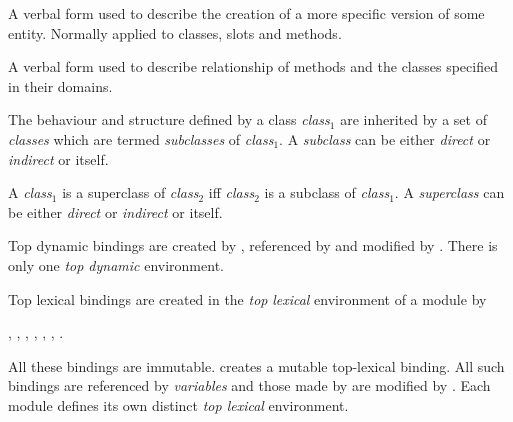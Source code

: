 \begin{optDefinition}
\begin{definitions}
     A verbal form used to
    describe the creation of a more specific version of some entity.  Normally
    applied to classes, slots and methods.

     A verbal form used
    to describe relationship of methods and the classes specified in their
    domains.

      The behaviour and structure
    defined by a class {\em class$_1$} are inherited by a set of {\em classes}
    which are termed {\em subclasses} of {\em class$_1$}.  A {\em subclass} can
    be either {\em direct} or {\em indirect} or itself.

      A {\em class$_1$} is a
    superclass of {\em class$_2$} iff {\em class$_2$} is a subclass of {\em
        class$_1$}.  A {\em superclass} can be either {\em direct} or {\em
        indirect} or itself.

     Top dynamic bindings
    are created by , referenced by 
    and modified by .  There is only one {\em top
        dynamic} environment.

     Top lexical bindings
    are created in the {\em top} {\em lexical} environment of a module by
    \begin{flushleft} , ,
        , ,
        , , .
    \end{flushleft}
    All these bindings are immutable.   creates a mutable
    top-lexical binding.  All such bindings are referenced by {\em variables}
    and those made by  are modified by .
    Each module defines its own distinct {\em top lexical} environment.

\end{definitions}
\end{optDefinition}
